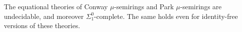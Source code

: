 \begin{corollary}
    The equational theories of Conway $\mu$-semirings and Park $\mu$-semirings are undecidable, and moreover $\Sigma^0_1$-complete.
    The same holds even for identity-free versions of these theories.
\end{corollary}










